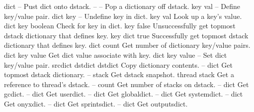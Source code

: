 \begin{longtable}{}
\hline
\optableent
	{dict}
	{{\bf {}}}
	{--}
	{Pust dict onto dstack.}
\hline
\optableent
	{--}
	{{\bf {}}}
	{--}
	{Pop a dictionary off dstack.}
\hline
\optableent
	{key val}
	{{\bf {}}}
	{--}
	{Define key/value pair.}
\hline
\optableent
	{dict key}
	{{\bf {}}}
	{--}
	{Undefine key in dict.}
\hline
\optableent
	{key}
	{{\bf {}}}
	{val}
	{Look up a key's value.}
\hline
\optableent
	{dict key}
	{{\bf {}}}
	{boolean}
	{Check for key in dict.}
\hline
\optableent
	{key}
	{{\bf {}}}
	{false}
	{Unsuccessfully get topmost dstack dictionary that defines key.}
\hline
\optableent
	{key}
	{{\bf {}}}
	{dict true}
	{Successfully get topmost dstack dictionary that defines key.}
\hline
\optableent
	{dict}
	{{\bf {}}}
	{count}
	{Get number of dictionary key/value pairs.}
\hline
\optableent
	{dict key}
	{{\bf {}}}
	{value}
	{Get dict value associate with key.}
\hline
\optableent
	{dict key value}
	{{\bf {}}}
	{--}
	{Set dict key/value pair.}
\hline
\optableent
	{srcdict dstdict}
	{{\bf {}}}
	{dstdict}
	{Copy dictionary contents.}
\hline
\optableent
	{--}
	{{\bf {}}}
	{dict}
	{Get topmost dstack dictionary.}
\hline
\optableent
	{--}
	{{\bf {}}}
	{stack}
	{Get dstack snapshot.}
\hline
\optableent
	{thread}
	{{\bf {}}}
	{stack}
	{Get a reference to thread's dstack.}
\hline
\optableent
	{--}
	{{\bf {}}}
	{count}
	{Get number of stacks on dstack.}
\hline
\optableent
	{--}
	{{\bf {}}}
	{dict}
	{Get gcdict.}
\hline
\optableent
	{--}
	{{\bf {}}}
	{dict}
	{Get userdict.}
\hline
\optableent
	{--}
	{{\bf {}}}
	{dict}
	{Get globaldict.}
\hline
\optableent
	{--}
	{{\bf {}}}
	{dict}
	{Get systemdict.}
\hline
\optableent
	{--}
	{{\bf {}}}
	{dict}
	{Get onyxdict.}
\hline
\optableent
	{--}
	{{\bf {}}}
	{dict}
	{Get sprintsdict.}
\hline
\optableent
	{--}
	{{\bf {}}}
	{dict}
	{Get outputsdict.}
\hline
\optableent

\end{longtable}
